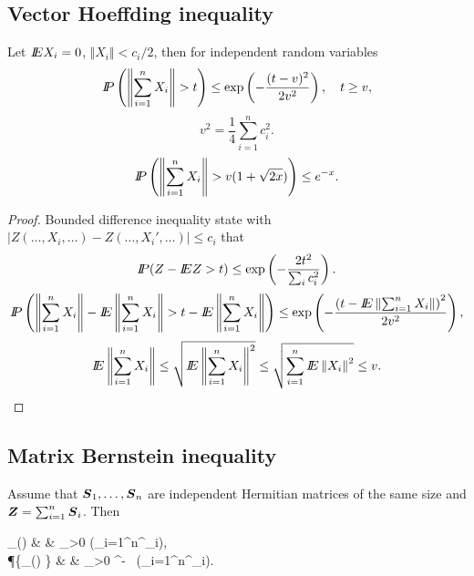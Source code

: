 




\usepackage{flowchart}
\usetikzlibrary{arrows}

\usepackage{natbib}



 
  


\subsection{Vector Hoeffding inequality}

\begin{theorem}
\label{vec_hoeff}
Let $\E X_i = 0$, $\Vert X_i \Vert < c_i / 2$, then for independent random variables
\[
\P\left(\left\Vert \sum_{i=1}^{n} X_i \right\Vert > t \right) \leq \text{exp} \left( - \frac{(t - v)^2}{2v^2} \right), 
\quad t \geq v,
\]
\[
v^2 = \frac{1}{4} \sum_{i=1}^{n} c_i^2.
\]
\[
\P\left(\left\Vert \sum_{i=1}^{n} X_i \right\Vert > v (1 + \sqrt{2x}) \right) \leq e^{-x}.
\]
\end{theorem}
\begin{proof}
Bounded difference inequality state with $|Z(\ldots,X_i,\ldots) - Z(\ldots,X_i',\ldots)| \leq c_i$ that
\[
\P(Z - \E Z > t) \leq  \exp \left( - \frac{2 t^2}{\sum_i c_i^2} \right). 
\]
\[
\pr{\normp{\sum_{i=1}^{n} X_i} - \E \normp{\sum_{i=1}^{n} X_i} > t - \E\normp{\sum_{i=1}^{n} X_i} } \leq \exp \left( - \frac{\left(t - \E \normp{\sum_{i=1}^{n} X_i} \right)^2}{2v^2} \right),
\] 
\[
\E \normp{\sum_{i=1}^{n} X_i} \leq \sqrt{  \E \normp{\sum_{i=1}^{n} X_i}^2 } \leq 
 \sqrt{ \sum_{i=1}^{n} \E \normp{X_i}^2 } \leq v.
\]
\end{proof}


\subsection{Matrix Bernstein inequality}

\begin{theorem}
\label{MastBound}
Assume that  \(\Sv_{1},\dots,\Sv_{n}\) are independent Hermitian matrices of the same size and  
\(\Zv = \sum_{i=1}^{n} \Sv_{i} \). 
Then 
\begin{EQA}
	\E \supA_{\max}(\Zv)
	& \leq &
	\inf_{\theta>0} 
	\log \tr\exp\left(\sum_{i=1}^{n}\log\E\ex^{\theta \Sv_{i}}\right),
\label{MaCheEx}
	\\
	\P\{\supA_{\max}(\Zv) \geq \zq\} 
	& \leq & 
	\inf_{\theta>0} \ex^{-\theta \zq} \, 
		\tr\exp\left(\sum_{i=1}^{n}\log\E \ex^{\theta \Sv_{i}}\right).
\label{MaCheProb}
\end{EQA}
\end{theorem}



